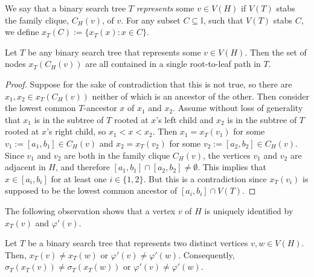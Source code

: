 \documentclass[kpfonts]{patmorin}
\begin{document}

We say that a binary search tree $T$ \emph{represents} some $v\in V(H)$ if $V(T)$ stabs the family clique, $C_H(v)$, of $v$.   For any subset $C\subseteq \mathbb{I}$, such that $V(T)$ stabs $C$, we define $x_T(C):=\{x_T(x):x\in C\}$.

\begin{lem}
  Let $T$ be any binary search tree that represents some $v\in V(H)$.  Then the set of nodes $x_T(C_H(v))$ are all contained in a single root-to-leaf path in $T$.
\end{lem}


\begin{proof}
  Suppose for the sake of contradiction that this is not true, so there are $x_1,x_2\in x_T(C_H(v))$ neither of which is an ancestor of the other.  Then consider the lowest common $T$-ancestor $x$ of $x_1$ and $x_2$.  Assume without loss of generality that $x_1$ is in the subtree of $T$ rooted at $x$'s left child and $x_2$ is in the subtree of $T$ rooted at $x$'s right child, so $x_1<x<x_2$. Then $x_1=x_T(v_1)$ for some $v_1:=[a_1,b_1]\in C_H(v)$ and $x_2=x_T(v_2)$ for some $v_2:=[a_2,b_2]\in C_H(v)$.  Since $v_1$ and $v_2$ are both in the family clique $C_H(v)$, the vertices $v_1$ and $v_2$ are adjacent in $H$, and therefore $[a_1,b_1]\cap[a_2,b_2]\neq\emptyset$.  This implies that $x\in [a_i,b_i]$ for at least one $i\in\{1,2\}$.  But this is a contradiction since $x_T(v_i)$ is supposed to be the lowest common ancestor of $[a_i,b_i]\cap V(T)$.
\end{proof}

The following observation shows that a vertex $v$ of $H$ is uniquely identified by $x_T(v)$ and $\varphi'(v)$.

\begin{obs}
    Let $T$ be a binary search tree that represents two distinct vertices $v,w\in V(H)$.  Then, $x_T(v)\neq x_T(w)$ or $\varphi'(v)\neq\varphi'(w)$.  Consequently, $\sigma_T(x_T(v))\neq \sigma_T(x_T(w))$ or $\varphi'(v)\neq\varphi'(w)$.
\end{obs}
\end{document}
